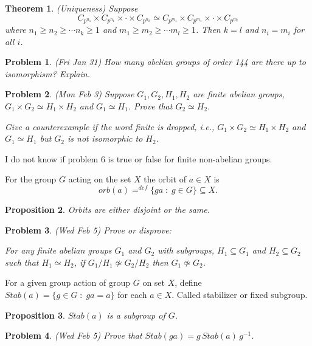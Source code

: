 \documentclass[12pt]{article}
\def\isom{\simeq}
\def\su{\subseteq}
\def\st{\;:\;}
\newtheorem{theorem}{Theorem}
\newtheorem{prop}[theorem]{Proposition}
\newtheorem{prob}{Problem}
\begin{document}

\begin{theorem}(Uniqueness)
Suppose 
$$C_{p^{n_1}}\times C_{p^{n_1}}\times\cdot\times C_{p^{n_k}}\isom
C_{p^{m_1}}\times C_{p^{m_1}}\times\cdot\times C_{p^{m_l}}$$
where $n_1\geq n_2\geq \cdots n_k\geq 1$ and 
$m_1\geq m_2\geq \cdots m_l\geq 1$.  Then $k=l$ and $n_i=m_i$ for
all $i$.
\end{theorem}

\begin{prob}(Fri Jan 31)
How many abelian groups of order 144 are there up to isomorphism?
Explain.
\end{prob}

\begin{prob}
(Mon Feb 3) Suppose $G_1,G_2,H_1,H_2$ are finite abelian groups,
$G_1\times G_2\isom H_1\times H_2$ and $G_1\isom H_1$.
Prove that $G_2\isom H_2$.
\par Give a counterexample if the word finite is dropped, i.e.,
$G_1\times G_2\isom H_1\times H_2$ and $G_1\isom H_1$ but $G_2$
is not isomorphic to $H_2$.   
\end{prob}

\noindent 
I do not know if problem 6 is true or false for finite non-abelian groups.

\bigskip
For the group $G$ acting on the set $X$
the orbit of $a\in X$ is
$$orb(a)=^{def}\{ga\st g\in G\}\su X.$$

\begin{prop} Orbits are either disjoint or the same.
\end{prop}

\begin{prob}
(Wed Feb 5) Prove or disprove:
\par For any finite abelian groups $G_1$ and $G_2$ with
subgroups, $H_1\su G_1$ and $H_2\su G_2$ such that $H_1\isom H_2$,
if $G_1/H_1\not\isom G_2/H_2$ then $G_1\not\isom G_2$.
\end{prob}

For a given group action of group $G$ on set
$X$, define $Stab(a)=\{g\in G\st ga=a\}$ for each $a\in X$.
Called stabilizer or fixed subgroup.

\begin{prop}
$Stab(a)$ is a subgroup of $G$.
\end{prop}

\begin{prob}
(Wed Feb 5) Prove that $Stab(ga)=g\,Stab(a)\,g^{-1}$.
\end{prob}
\end{document}
